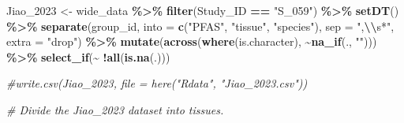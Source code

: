 \documentclass[
]{article}
\newenvironment{Shaded}{\begin{snugshade}}{\end{snugshade}}
\newcommand{\AttributeTok}[1]{\textcolor[rgb]{0.13,0.29,0.53}{#1}}
\newcommand{\CommentTok}[1]{\textcolor[rgb]{0.56,0.35,0.01}{\textit{#1}}}
\newcommand{\FunctionTok}[1]{\textcolor[rgb]{0.13,0.29,0.53}{\textbf{#1}}}
\newcommand{\NormalTok}[1]{#1}
\newcommand{\OtherTok}[1]{\textcolor[rgb]{0.56,0.35,0.01}{#1}}
\newcommand{\SpecialCharTok}[1]{\textcolor[rgb]{0.81,0.36,0.00}{\textbf{#1}}}
\newcommand{\StringTok}[1]{\textcolor[rgb]{0.31,0.60,0.02}{#1}}
\begin{document}
\begin{Shaded}
\begin{Highlighting}[]
\NormalTok{Jiao\_2023 }\OtherTok{\textless{}{-}}\NormalTok{ wide\_data }\SpecialCharTok{\%\textgreater{}\%} 
  \FunctionTok{filter}\NormalTok{(Study\_ID }\SpecialCharTok{==} \StringTok{"S\_059"}\NormalTok{) }\SpecialCharTok{\%\textgreater{}\%} 
  \FunctionTok{setDT}\NormalTok{() }\SpecialCharTok{\%\textgreater{}\%}
  \FunctionTok{separate}\NormalTok{(group\_id, }\AttributeTok{into =} \FunctionTok{c}\NormalTok{(}\StringTok{"PFAS"}\NormalTok{, }\StringTok{"tissue"}\NormalTok{, }\StringTok{"species"}\NormalTok{), }\AttributeTok{sep =} \StringTok{",}\SpecialCharTok{\textbackslash{}\textbackslash{}}\StringTok{s*"}\NormalTok{, }\AttributeTok{extra =} \StringTok{"drop"}\NormalTok{) }\SpecialCharTok{\%\textgreater{}\%} 
  \FunctionTok{mutate}\NormalTok{(}\FunctionTok{across}\NormalTok{(}\FunctionTok{where}\NormalTok{(is.character), }\SpecialCharTok{\textasciitilde{}}\FunctionTok{na\_if}\NormalTok{(., }\StringTok{""}\NormalTok{))) }\SpecialCharTok{\%\textgreater{}\%} 
  \FunctionTok{select\_if}\NormalTok{(}\SpecialCharTok{\textasciitilde{}} \SpecialCharTok{!}\FunctionTok{all}\NormalTok{(}\FunctionTok{is.na}\NormalTok{(.)))}

\CommentTok{\#write.csv(Jiao\_2023, file = here("Rdata", "Jiao\_2023.csv"))}

\CommentTok{\# Divide the Jiao\_2023 dataset into tissues.}


\end{Highlighting}
\end{Shaded}
\end{document}
